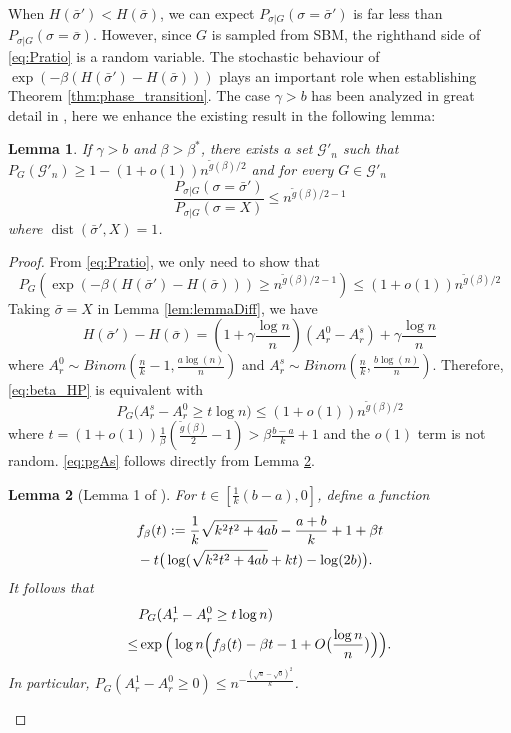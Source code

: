 \documentclass[journal]{IEEEtran}
\newtheorem{lemma}{Lemma}
\newcommand{\A}{\frac{a \log(n)}{n}}
\newcommand{\B}{\frac{b \log(n)}{n}}
\newcommand{\cG}{\mathcal{G}}
\newcommand{\1}{\mathbbm{1}}
\DeclareMathOperator{\dist}{dist}
\begin{document}
When $H(\bar{\sigma}') < H(\bar{\sigma})$, we can expect $P_{\sigma | G}(\sigma = \bar{\sigma}')$ is far less than 
$P_{\sigma | G}(\sigma = \bar{\sigma})$. However,
since $G$ is sampled from SBM, the righthand side of \eqref{eq:Pratio} is a random variable. The stochastic behaviour
of $ \exp(-\beta(H(\bar{\sigma}') - H(\bar{\sigma}))) $ plays an important role when establishing Theorem \ref{thm:phase_transition}.
The case $\gamma > b$ has been analyzed in great detail in \cite{sibmmc}, here we enhance the existing result in the following lemma:
\begin{lemma}\label{lem:specialCase}
If $\gamma> b$ and $\beta > \beta^*$, there exists a set $\cG'_n$ such that
$P_G(\cG'_n) \geq 1 - (1+o(1))n^{\tilde{g}(\beta)/2}$ and for every $G\in \cG'_n$
\begin{equation}
\frac{P_{\sigma |G } (\sigma = \bar{\sigma}')}{P_{\sigma |G } (\sigma = X)} \leq n^{\tilde{g}(\beta)/2-1}
\end{equation}
where $\dist(\bar{\sigma}',X)=1$.
\end{lemma}
\begin{proof}
	From \eqref{eq:Pratio}, we only need to show that
	\begin{equation}\label{eq:beta_HP}
	P_G( \exp(-\beta(H(\bar{\sigma}') - H(\bar{\sigma}))) \geq n^{\tilde{g}(\beta)/2-1}) \leq (1+o(1))n^{\tilde{g}(\beta)/2}
	\end{equation}
	Taking $\bar{\sigma}=X$ in Lemma \ref{lem:lemmaDiff}, we have
	\begin{equation}\label{eq:energy_diff}
	H(\bar{\sigma}') - H(\bar{\sigma}) = (1+\gamma \frac{\log n}{n})(A^0_r - A^s_r) + \gamma\frac{\log n}{n}
	\end{equation}
	where $A_r^0 \sim Binom(\frac{n}{k}-1, \A)$ and $A^s_r \sim Binom(\frac{n}{k}, \B)$.
	Therefore, \eqref{eq:beta_HP} is equivalent with
	\begin{equation}\label{eq:pgAs}
	P_G\big(A^s_r - A_r^0 \geq t\log n\big)
	\leq (1+o(1))n^{\tilde{g}(\beta)/2}
	\end{equation}
	where $t=(1+o(1))\frac{1}{\beta}(\frac{\tilde{g}(\beta)}{2} -1)>\beta\frac{b-a}{k}+1$ and the $o(1)$ term is not random.
	\eqref{eq:pgAs} follows directly from Lemma \ref{lem:fb}.
\begin{lemma}[Lemma 1 of \cite{sibmmc}]\label{lem:fb}
	For $t\in [\frac{1}{k}(b-a), 0]$,
	define a function
	\begin{align}
	&f_{\beta}(t):=\frac{1}{k}\sqrt{k^2t^2+4ab} -\frac{a+b}{k} +1 +\beta t  \notag\\
	&-t\big(\log(\sqrt{k^2t^2+4ab}+kt)-\log(2b) \big). \label{eq:fbetat}
	\end{align}
	It follows that
	\begin{align} 
	& P_G(A^1_r-A^0_r\ge t\log n)  \notag\\
	\le &  \exp\Big(\log n \Big(f_{\beta}(t) -\beta t  - 1 + O\big(\frac{\log n}{n}\big) \Big)\Big) .
	\end{align}
	In particular, $P_G(A^1_r-A^0_r\ge 0 ) \leq n^{-\frac{(\sqrt{a}-\sqrt{b})^2}{k}} $.
\end{lemma}	
\end{proof}
\end{document}
